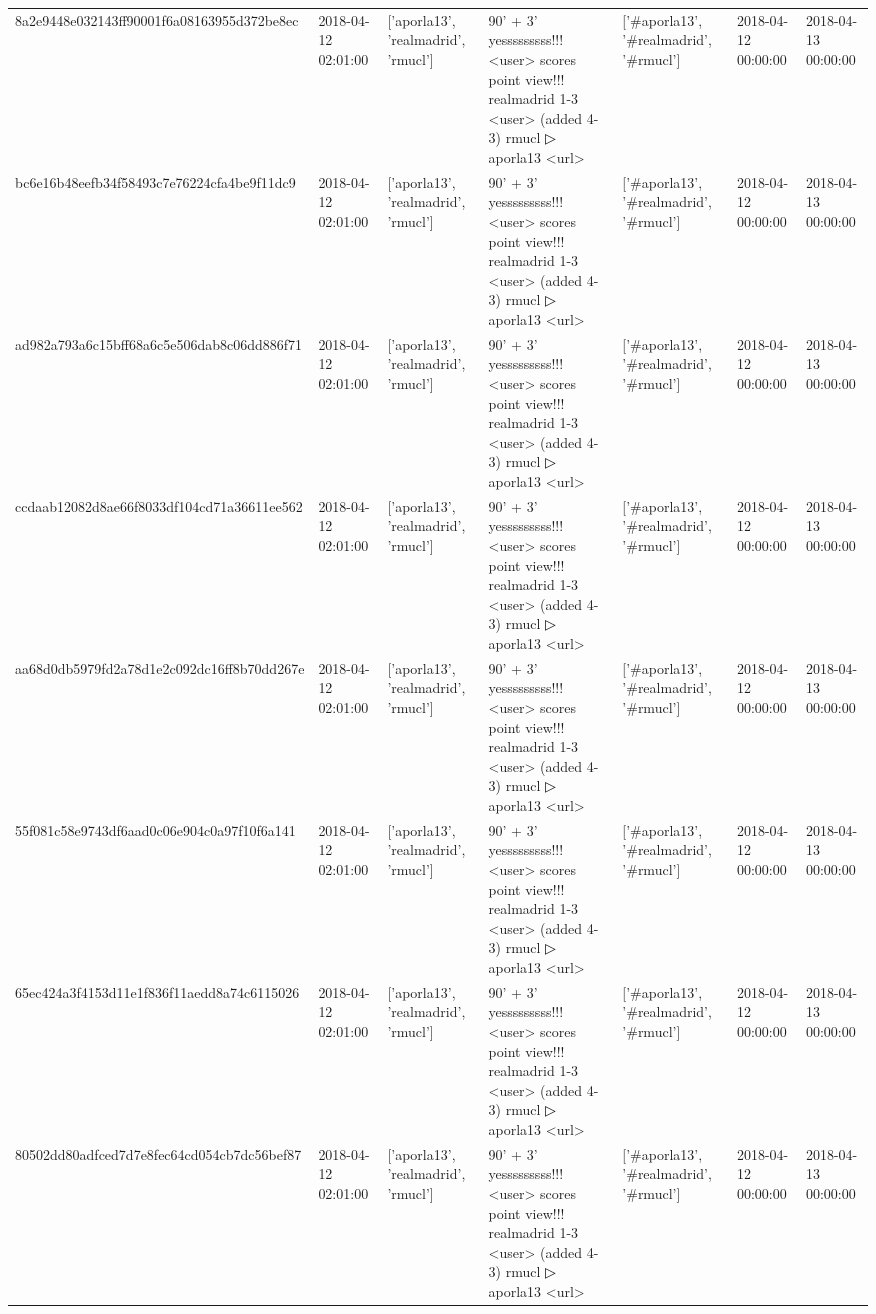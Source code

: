\begin{tabular}{lllllll}
8a2e9448e032143ff90001f6a08163955d372be8ec & 2018-04-12 02:01:00 & ['aporla13', 'realmadrid', 'rmucl'] & 90' + 3' yesssssssss!!! <user> scores point view!!! realmadrid 1-3 <user> (added 4-3) rmucl ▷ aporla13 <url> & ['#aporla13', '#realmadrid', '#rmucl'] & 2018-04-12 00:00:00 & 2018-04-13 00:00:00 \\
bc6e16b48eefb34f58493c7e76224cfa4be9f11dc9 & 2018-04-12 02:01:00 & ['aporla13', 'realmadrid', 'rmucl'] & 90' + 3' yesssssssss!!! <user> scores point view!!! realmadrid 1-3 <user> (added 4-3) rmucl ▷ aporla13 <url> & ['#aporla13', '#realmadrid', '#rmucl'] & 2018-04-12 00:00:00 & 2018-04-13 00:00:00 \\
ad982a793a6c15bff68a6c5e506dab8c06dd886f71 & 2018-04-12 02:01:00 & ['aporla13', 'realmadrid', 'rmucl'] & 90' + 3' yesssssssss!!! <user> scores point view!!! realmadrid 1-3 <user> (added 4-3) rmucl ▷ aporla13 <url> & ['#aporla13', '#realmadrid', '#rmucl'] & 2018-04-12 00:00:00 & 2018-04-13 00:00:00 \\
ccdaab12082d8ae66f8033df104cd71a36611ee562 & 2018-04-12 02:01:00 & ['aporla13', 'realmadrid', 'rmucl'] & 90' + 3' yesssssssss!!! <user> scores point view!!! realmadrid 1-3 <user> (added 4-3) rmucl ▷ aporla13 <url> & ['#aporla13', '#realmadrid', '#rmucl'] & 2018-04-12 00:00:00 & 2018-04-13 00:00:00 \\
aa68d0db5979fd2a78d1e2c092dc16ff8b70dd267e & 2018-04-12 02:01:00 & ['aporla13', 'realmadrid', 'rmucl'] & 90' + 3' yesssssssss!!! <user> scores point view!!! realmadrid 1-3 <user> (added 4-3) rmucl ▷ aporla13 <url> & ['#aporla13', '#realmadrid', '#rmucl'] & 2018-04-12 00:00:00 & 2018-04-13 00:00:00 \\
55f081c58e9743df6aad0c06e904c0a97f10f6a141 & 2018-04-12 02:01:00 & ['aporla13', 'realmadrid', 'rmucl'] & 90' + 3' yesssssssss!!! <user> scores point view!!! realmadrid 1-3 <user> (added 4-3) rmucl ▷ aporla13 <url> & ['#aporla13', '#realmadrid', '#rmucl'] & 2018-04-12 00:00:00 & 2018-04-13 00:00:00 \\
65ec424a3f4153d11e1f836f11aedd8a74c6115026 & 2018-04-12 02:01:00 & ['aporla13', 'realmadrid', 'rmucl'] & 90' + 3' yesssssssss!!! <user> scores point view!!! realmadrid 1-3 <user> (added 4-3) rmucl ▷ aporla13 <url> & ['#aporla13', '#realmadrid', '#rmucl'] & 2018-04-12 00:00:00 & 2018-04-13 00:00:00 \\
80502dd80adfced7d7e8fec64cd054cb7dc56bef87 & 2018-04-12 02:01:00 & ['aporla13', 'realmadrid', 'rmucl'] & 90' + 3' yesssssssss!!! <user> scores point view!!! realmadrid 1-3 <user> (added 4-3) rmucl ▷ aporla13 <url> & ['#aporla13', '#realmadrid', '#rmucl'] & 2018-04-12 00:00:00 & 2018-04-13 00:00:00 \\

\end{tabular}
